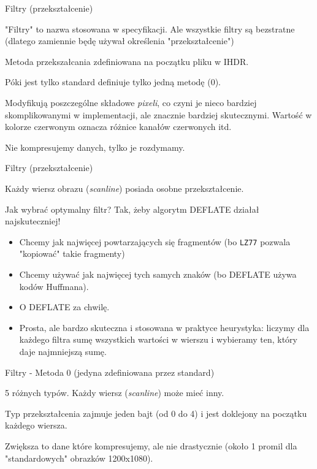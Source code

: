 \documentclass[presentation]{beamer}
\begin{document}
\begin{frame}[label={sec:orga94417b}]{Filtry (przekształcenie)}
\begin{block}{"Filtry" to nazwa stosowana w specyfikacji. Ale wszystkie filtry są bezstratne (dlatego zamiennie będę używał określenia "przekształcenie")}
\end{block}
\begin{block}{Metoda przekszałcania zdefiniowana na początku pliku w {\color{blue}IHDR}.}
\end{block}
\begin{block}{Póki jest tylko standard definiuje tylko jedną metodę (0).}
\end{block}
\begin{block}{Modyfikują poszczególne składowe \emph{pixeli}, co czyni je nieco bardziej skomplikowanymi w implementacji, ale znacznie bardziej skutecznymi. Wartość w kolorze czerwonym oznacza różnice kanałów czerwonych itd.}
\end{block}
\begin{block}{Nie kompresujemy danych, tylko je rozdymamy.}
\end{block}
\end{frame}

\begin{frame}[label={sec:org303ebe8}]{Filtry (przekształcenie)}
\begin{block}{Każdy wiersz obrazu (\emph{scanline}) posiada osobne przekształcenie.}
\end{block}
\begin{block}{Jak wybrać optymalny filtr? Tak, żeby algorytm DEFLATE działał najskuteczniej!}
\begin{itemize}
\item Chcemy jak najwięcej powtarzających się fragmentów (bo \texttt{LZ77}
pozwala "kopiować" takie fragmenty)
\item Chcemy używać jak najwięcej tych samych znaków (bo DEFLATE używa
kodów Huffmana).
\item O DEFLATE za chwilę.
\item Prosta, ale bardzo skuteczna i stosowana w praktyce heurystyka: liczymy
dla każdego filtra sumę wszystkich wartości w wierszu i wybieramy ten,
który daje najmniejszą sumę.
\end{itemize}
\end{block}
\end{frame}

\begin{frame}[label={sec:orge38d899}]{Filtry - Metoda 0 (jedyna zdefiniowana przez standard)}
\begin{block}{5 różnych typów. Każdy wiersz (\emph{scanline}) może mieć inny.}
\end{block}
\begin{block}{Typ przekształcenia zajmuje jeden bajt (od 0 do 4) i jest doklejony na początku każdego wiersza.}
\end{block}
\begin{block}{Zwiększa to dane które kompresujemy, ale nie drastycznie (około 1 promil dla "standardowych" obrazków 1200x1080).}
\end{block}
\end{frame}
\end{document}
